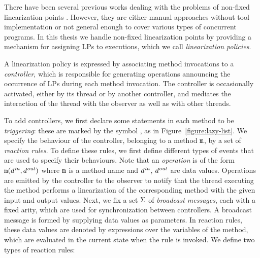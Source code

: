  There have been several previous works dealing with the problems of non-fixed linearization points \cite{Poling,Colvin:Lazy-List,CGLM:cav06,SWD:cav12,Derrick:fm14,SDW:tcl14,Vafeiadis:cav10,Vafeiadis:Aspect}. However, they are either manual approaches without tool implementation or not general enough to cover various types of concurrent programs. 
 In this thesis we handle non-fixed linearization points by providing a mechanism for assigning LPs to executions, which we call \emph{linearization policies}. %

A linearization policy is expressed by associating method invocations to a \emph{controller}, which is responsible for generating operations announcing the occurrence of LPs during each method invocation. The controller is occasionally activated, either by its thread or by another controller, and mediates the interaction of the thread with the
observer as well as with other threads.

To add controllers, we first declare 
some statements in each method to be {\it triggering}: 
these are marked by the symbol \commitpoint,
as in Figure~\ref{figure:lazy-list}.
%
We specify the behaviour of the controller, belonging to a method
${\tt m}$, by a set  of
{\em reaction rules}. 
%
%
To define these rules, we first define different types of events
that are used to specify their behaviours.
%
Note that an {\it operation} is of the form ${\tt m}(d^{\it in},d^{\it out})$ where 
${\tt m}$ is a method name and $d^{\it in}$, $d^{\it out}$ are data values.
Operations are emitted by the controller to the observer to notify 
that the thread executing the method performs a linearization of
the corresponding method with the given input and output values.
Next, we fix a set $\Sigma$ of {\it broadcast messages},
each with a fixed  arity, which are used for
synchronization between controllers. A broadcast message is formed by supplying data
values as parameters. In reaction rules, these data values are denoted by
expressions over the variables of the method, which are evaluated in the
current state when the rule is invoked. We define two types of reaction rules: 

